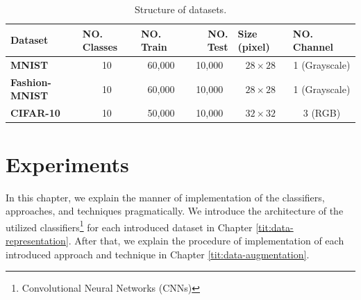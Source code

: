 \begin{table}[]
  \label{dataset_table}
  \begin{tabular}{
      l |
      c
      c
      c
      c
      c}
    \hline
    {\textbf{Dataset}}       & \multicolumn{1}{l}{{\textbf{NO. Classes}}} & \multicolumn{1}{l}{{\textbf{NO. Train}}} & \multicolumn{1}{r}{{\textbf{NO. Test}}} & \multicolumn{1}{l}{{\textbf{Size (pixel)}}} & \multicolumn{1}{l}{{\textbf{NO. Channel}}} \\ \hline
    {\textbf{MNIST}}         & 10                                         & 60,000
                             & 10,000                                     & $28\times28$                             & 1
    (Grayscale)                                                                                                                                                                                                                                           \\
    {\textbf{Fashion-MNIST}} & 10                                         & 60,000
                             & 10,000                                     & $28\times28$
                             & 1 (Grayscale)                                                                                                                                                                                                              \\
    {\textbf{CIFAR-10}}      & 10                                         & 50,000
                             & 10,000                                     & $32\times32$                             & 3
    (RGB)                                                                                                                                                                                                                                                 \\ \hline
  \end{tabular}
  \caption{Structure of datasets.}
\end{table}


\chapter{Experiments}
In this chapter, we explain the manner of implementation of the classifiers, approaches, and
techniques pragmatically. We introduce the architecture of the utilized
classifiers\footnote{Convolutional Neural Networks (CNNs)} for each introduced dataset in Chapter
\ref{tit:data-representation}. After that, we explain the procedure of implementation of each
introduced approach and technique in Chapter \ref{tit:data-augmentation}.

